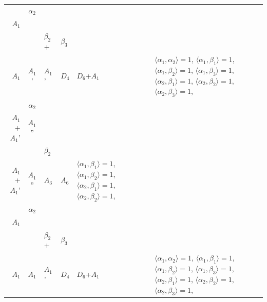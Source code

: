 \documentclass[12pt]{report}
\begin{document}
\begin{appendix}
{\begin{longtable}{rcl p{1cm}p{1cm}p{3cm} }
\\
\begin{tabular}{cc}$\alpha_1$+ & $\alpha_2$\\\tiny{ $A_1$ } & \tiny{  }\end{tabular} &\begin{tabular}{c} = \\~ \end{tabular} & \begin{tabular}{ccc}$\beta_1$+ & $\beta_2$+ & $\beta_3$\\\tiny{ $A_1$ } & \tiny{ $A_1$' } & \tiny{ $A_1$' }\end{tabular} & $D_4$ & $D_6$+$A_1$ & $\langle\alpha_1, \alpha_2\rangle=1$,  $\langle\alpha_1, \beta_1\rangle=1$, $\langle\alpha_1, \beta_2\rangle=1$, $\langle\alpha_1, \beta_3\rangle=1$, $\langle\alpha_2, \beta_1\rangle=1$, $\langle\alpha_2, \beta_2\rangle=1$, $\langle\alpha_2, \beta_3\rangle=1$, 
\\
\begin{tabular}{cc}$\alpha_1$+ & $\alpha_2$\\\tiny{ $A_1$+$A_1$' } & \tiny{ $A_1$'' }\end{tabular} &\begin{tabular}{c} = \\~ \end{tabular} & \begin{tabular}{cc}$\beta_1$+ & $\beta_2$\\\tiny{ $A_1$+$A_1$' } & \tiny{ $A_1$'' }\end{tabular} & $A_3$ & $A_6$ &  $\langle\alpha_1, \beta_1\rangle=1$, $\langle\alpha_1, \beta_2\rangle=1$, $\langle\alpha_2, \beta_1\rangle=1$, $\langle\alpha_2, \beta_2\rangle=1$, 
\\
\begin{tabular}{cc}$\alpha_1$+ & $\alpha_2$\\\tiny{ $A_1$ } & \tiny{  }\end{tabular} &\begin{tabular}{c} = \\~ \end{tabular} & \begin{tabular}{ccc}$\beta_1$+ & $\beta_2$+ & $\beta_3$\\\tiny{ $A_1$ } & \tiny{ $A_1$ } & \tiny{ $A_1$' }\end{tabular} & $D_4$ & $D_6$+$A_1$ & $\langle\alpha_1, \alpha_2\rangle=1$,  $\langle\alpha_1, \beta_1\rangle=1$, $\langle\alpha_1, \beta_2\rangle=1$, $\langle\alpha_1, \beta_3\rangle=1$, $\langle\alpha_2, \beta_1\rangle=1$, $\langle\alpha_2, \beta_2\rangle=1$, $\langle\alpha_2, \beta_3\rangle=1$, 

\end{longtable}}
\end{appendix}
\end{document}
